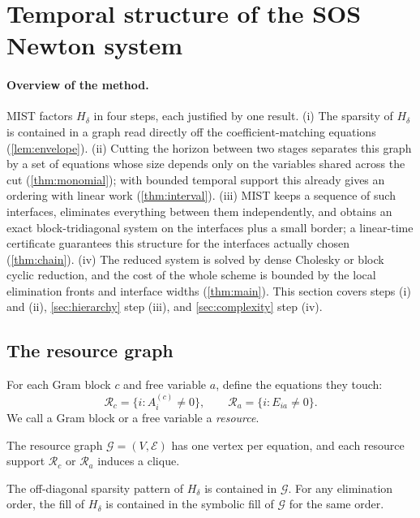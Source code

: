 \section{Temporal structure of the SOS Newton system}\label{sec:structure}

\paragraph{Overview of the method.}
MIST factors $H_\delta$ in four steps, each justified by one result.
(i) The sparsity of $H_\delta$ is contained in a graph read directly off the
coefficient-matching equations (\cref{lem:envelope}).
(ii) Cutting the horizon between two stages separates this graph by a set of
equations whose size depends only on the variables shared across the cut
(\cref{thm:monomial}); with bounded temporal support this already gives an
ordering with linear work (\cref{thm:interval}).
(iii) MIST keeps a sequence of such interfaces, eliminates everything between
them independently, and obtains an exact block-tridiagonal system on the
interfaces plus a small border; a linear-time certificate guarantees this
structure for the interfaces actually chosen (\cref{thm:chain}).
(iv) The reduced system is solved by dense Cholesky or block cyclic reduction,
and the cost of the whole scheme is bounded by the local elimination fronts and
interface widths (\cref{thm:main}). This section covers steps (i) and (ii),
\cref{sec:hierarchy} step (iii), and \cref{sec:complexity} step (iv).

\subsection{The resource graph}

For each Gram block $c$ and free variable $a$, define the equations they touch:
\begin{equation}\label{eq:support}
\mathcal R_c=\{i:A_i^{(c)}\ne0\},\qquad \mathcal R_a=\{i:E_{ia}\ne0\}.
\end{equation}
We call a Gram block or a free variable a \emph{resource}.

\begin{definition}\label{def:resource}
The resource graph $\mathcal G=(V,\mathcal E)$ has one vertex per equation, and
each resource support $\mathcal R_c$ or $\mathcal R_a$ induces a clique.
\end{definition}

\begin{lemma}\label{lem:envelope}
The off-diagonal sparsity pattern of $H_\delta$ is contained in $\mathcal G$. For
any elimination order, the fill of $H_\delta$ is contained in the symbolic fill of
$\mathcal G$ for the same order.
\end{lemma}


